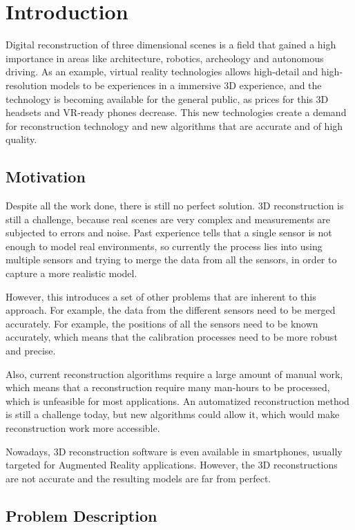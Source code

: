 \chapter{Introduction}

Digital reconstruction of three dimensional scenes is a field that gained a high importance in areas like architecture, robotics, archeology and autonomous driving. As an example, virtual reality technologies allows high-detail and high-resolution models to be experiences in a immersive 3D experience, and the technology is becoming available for the general public, as prices for this 3D headsets and VR-ready phones decrease. This new technologies create a demand for reconstruction technology and new algorithms that are accurate and of high quality.

\section{Motivation}

Despite all the work done, there is still no perfect solution. 3D reconstruction is still a challenge, because real scenes are very complex and measurements are subjected to errors and noise. Past experience tells that a single sensor is not enough to model real environments, so currently the process lies into using multiple sensors and trying to merge the data from all the sensors, in order to capture a more realistic model.

However, this introduces a set of other problems that are inherent to this approach. For example, the data from the different sensors need to be merged accurately. For example, the positions of all the sensors need to be known accurately, which means that the calibration processes need to be more robust and precise.

Also, current reconstruction algorithms require a large amount of manual work, which means that a reconstruction require many man-hours to be processed, which is unfeasible for most applications. An automatized reconstruction method is still a challenge today, but new algorithms could allow it, which would make reconstruction work more accessible.

Nowadays, 3D reconstruction software is even available in smartphones, usually targeted for Augmented Reality applications. However, the 3D reconstructions are not accurate and the resulting models are far from perfect.

\section{Problem Description}

